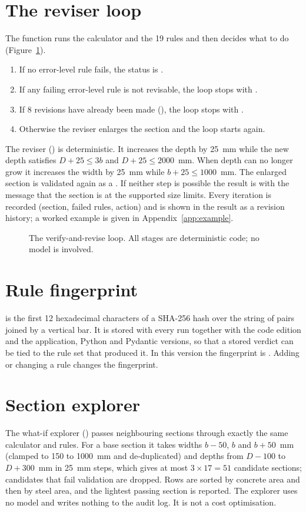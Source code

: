 \section{The reviser loop}
The function  runs the calculator and the 19 rules and then decides what to do (Figure~\ref{fig:loop}).
\begin{enumerate}
  \item If no error-level rule fails, the status is .
  \item If any failing error-level rule is not revisable, the loop stops with .
  \item If 8 revisions have already been made (), the loop stops with .
  \item Otherwise the reviser enlarges the section and the loop starts again.
\end{enumerate}
The reviser () is deterministic. It increases the depth by 25~mm while the new depth satisfies $D + 25 \le 3b$ and $D + 25 \le 2000$~mm. When depth can no longer grow it increases the width by 25~mm while $b + 25 \le 1000$~mm. The enlarged section is validated again as a . If neither step is possible the result is  with the message that the section is at the supported size limits. Every iteration is recorded (section, failed rules, action) and is shown in the result as a revision history; a worked example is given in Appendix~\ref{app:example}.

\begin{figure}[H]
\centering

\caption{The verify-and-revise loop. All stages are deterministic code; no model is involved.}
\label{fig:loop}
\end{figure}

\section{Rule fingerprint}
 is the first 12 hexadecimal characters of a SHA-256 hash over the string of  pairs joined by a vertical bar. It is stored with every run together with the code edition and the application, Python and Pydantic versions, so that a stored verdict can be tied to the rule set that produced it. In this version the fingerprint is . Adding or changing a rule changes the fingerprint.

\section{Section explorer}
The what-if explorer () passes neighbouring sections through exactly the same calculator and rules. For a base section it takes widths $b-50$, $b$ and $b+50$~mm (clamped to 150 to 1000~mm and de-duplicated) and depths from $D-100$ to $D+300$~mm in 25~mm steps, which gives at most $3 \times 17 = 51$ candidate sections; candidates that fail  validation are dropped. Rows are sorted by concrete area and then by steel area, and the lightest passing section is reported. The explorer uses no model and writes nothing to the audit log. It is not a cost optimisation.
